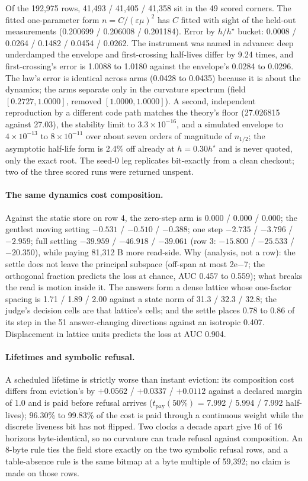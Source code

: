 \documentclass{article}
\newcommand{\sci}[2]{\ensuremath{#1\times10^{#2}}}
\begin{document}
\noindent Of the 192,975 rows, 41,493 / 41,405 / 41,358 sit in the 49 scored corners. The fitted
one-parameter form $n=C/(\varepsilon\mu)^2$ has $C$ fitted with sight of the held-out measurements
(0.200699 / 0.206008 / 0.201184).
Error by $h/h^\star$ bucket: 0.0008 / 0.0264 / 0.1482 / 0.0454 / 0.0262. The instrument was named in
advance: deep underdamped the envelope and first-crossing half-lives differ by 9.24 times, and
first-crossing's error is 1.0088 to 1.0180 against the envelope's 0.0284 to 0.0296.
The law's error is identical across arms (0.0428 to 0.0435) because it is about the dynamics; the
arms separate only in the curvature spectrum (field $[0.2727, 1.0000]$, removed $[1.0000, 1.0000]$).
A second, independent reproduction by a different code path matches the theory's floor
(27.026815 against 27.03), the stability limit to \sci{3.3}{-16}, and a simulated envelope to
\sci{4}{-13} to \sci{8}{-11} over about seven orders of magnitude of $n_{1/2}$; the asymptotic
half-life form is 2.4\% off already at $h=0.30h^\star$ and is never quoted, only the exact root.
The seed-0 leg replicates bit-exactly from a clean checkout; two of the three scored runs were
returned unspent.

\paragraph{The same dynamics cost composition.} Against the static store on row 4, the zero-step
arm is $0.000$ / $0.000$ / $0.000$; the gentlest moving setting $-0.531$ / $-0.510$ / $-0.388$; one
step $-2.735$ / $-3.796$ / $-2.959$; full settling $-39.959$ / $-46.918$ / $-39.061$ (row 3:
$-15.800$ / $-25.533$ / $-20.350$), while paying 81,312 B more read-side.
Why (analysis, not a row): the settle does not leave the principal subspace (off-span at most
2e$-$7; the orthogonal fraction predicts the loss at chance, AUC 0.457 to 0.559); what breaks the
read is motion inside it. The answers form a dense lattice whose one-factor spacing is 1.71 / 1.89 /
2.00 against a state norm of 31.3 / 32.3 / 32.8; the judge's decision cells are that lattice's
cells; and the settle places 0.78 to 0.86 of its step in the 51 answer-changing directions against
an isotropic 0.407. Displacement in lattice units predicts the loss at AUC 0.904.

\paragraph{Lifetimes and symbolic refusal.} A scheduled lifetime is strictly worse than instant
eviction: its composition cost differs from eviction's by $+0.0562$ / $+0.0337$ / $+0.0112$ against a
declared margin of 1.0 and is paid before refusal arrives ($t_{\text{pay}}(50\%)$ = 7.992 / 5.994 /
7.992 half-lives); 96.30\% to 99.83\% of the cost is paid through a continuous weight while the
discrete liveness bit has not flipped.
Two clocks a decade apart give 16 of 16 horizons byte-identical, so no curvature can trade refusal
against composition. An 8-byte rule ties the field store exactly on the two symbolic refusal rows,
and a table-absence rule is the same bitmap at a byte multiple of 59,392; no claim is made on those
rows.
\end{document}
